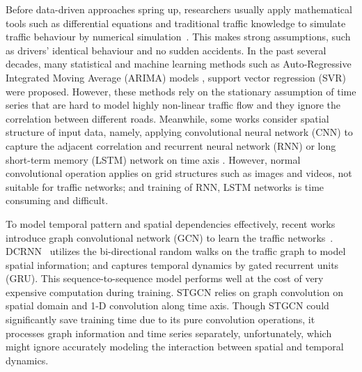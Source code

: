 \documentclass{article}
\begin{document}
Before data-driven approaches spring up, researchers usually apply mathematical tools such as differential equations and traditional traffic knowledge to simulate traffic behaviour by numerical simulation~\cite{vlahogianni2015computtionl}. This makes strong assumptions, such as drivers' identical behaviour and no sudden accidents. In the past several decades, many statistical and machine learning methods such as Auto-Regressive Integrated Moving Average (ARIMA) models \cite{yu2004switching,williams2003modeling}, support vector regression (SVR) \cite{hong2011traffic}  
were proposed. However, these methods rely on the stationary assumption of time series that are hard to model highly non-linear traffic flow and they ignore the correlation between different roads. Meanwhile, some works consider spatial structure of input data, namely, applying convolutional neural network (CNN) to capture the adjacent correlation and recurrent neural network (RNN) or long short-term memory (LSTM) network on time axis  \cite{ma2017learning,wu2016short,zhao2017lstm}. However, normal convolutional operation applies on grid structures such as images and videos, not suitable for traffic networks; and training of RNN, LSTM networks is time consuming and difficult.

To model temporal pattern and spatial dependencies effectively, recent works introduce graph convolutional network (GCN) to learn the traffic networks~\cite{li2018diffusion,defferrard2016convolutional}. DCRNN~\cite{li2018diffusion} utilizes the bi-directional random walks on the traffic graph to model spatial information; and captures temporal dynamics by gated recurrent units (GRU). This sequence-to-sequence model performs well at the cost of very expensive computation during training. STGCN \cite{yuspatio} relies on graph convolution on spatial domain and 1-D convolution along time axis. Though STGCN could significantly save training time due to its pure convolution operations, it processes graph information and time series separately, unfortunately, which might ignore accurately modeling the interaction between spatial and temporal dynamics. 
 
\end{document}
